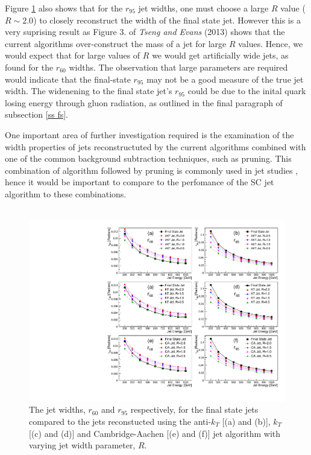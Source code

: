 \documentclass[a4paper,11pt, onecolumn]{article}
\begin{document}
  Figure \ref{r all} also shows that for the $r_{95}$ jet widths, one must choose a large $R$ value ($R \sim 2.0$) to closely reconstruct the width of the final state
  jet. However this is a very suprising result as Figure 3. of \emph{Tseng and Evans} (2013) \cite{sc}
  shows that the current algorithms over-construct the mass of 
  a jet for large $R$ values. Hence, we would expect that for large values of $R$ we would get artificially wide jets, as found for the $r_{60}$ widths.
  The observation that large parameters are required would indicate that the final-state $r_{95}$ may not be a good measure of the true jet width. The widenening to the 
  final state jet's $r_{95}$ could be due to the inital quark losing energy through gluon radiation, as outlined in the final paragraph of subsection \ref{ss fs}. \newpage

  One important area of further investigation required is the examination of the width properties of jets reconstructuted by the current algorithms combined with
  one of the common background subtraction techniques, such as pruning. This combination of algorithm followed by pruning is commonly used in jet studies \cite{ATLAS} 
  \cite{CMS}, hence it would be important to compare to the perfomance of the SC jet algorithm to these combinations. \\ \\

  \begin{figure}[!htb]
    \begin{center}
      \includegraphics[width = \textwidth]{r_all}
      \caption{The jet widths, $r_{60}$ and $r_{95}$ respectively, for the final state jets compared to the jets reconstucted using the anti-$k_{T}$ [(a) and (b)], 
               $k_{T}$ [(c) and (d)] and Cambridge-Aachen [(e) and (f)] jet algorithm with varying jet width parameter, $R$.}
      \label{r all}
    \end{center}
  \end{figure}
\end{document}
